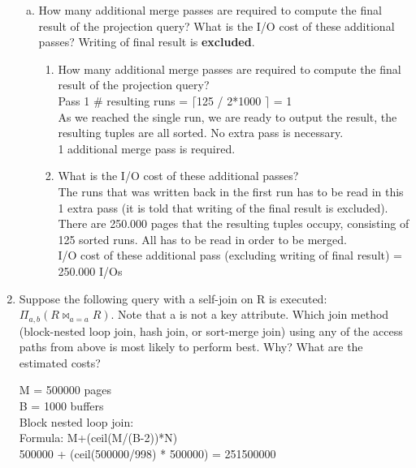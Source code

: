 \documentclass[10pt]{article}
\begin{document}
\begin{enumerate}
\begin{enumerate}[(a)]
			\item How many additional merge passes are required to compute the final result of the projection query? What is the I/O cost of these additional passes? Writing of final	result is \textbf{excluded}.
			
			\begin{enumerate}[1)]
				\item How many additional merge passes are required to compute the final result of the projection query?\\
				
				Pass 1 \# resulting runs = $ \Big\lceil$125 / 2*1000 $ \Big\rceil$ = 1\\
				As we reached the single run, we are ready to output the result, the resulting tuples are all sorted. No extra pass is necessary.\\
				
				1 additional merge pass is required.\\
				
				\item What is the I/O cost of these additional passes?\\
				
				The runs that was written back in the first run has to be read in this 1 extra pass (it is told that writing of the final result is excluded).\\
				
				There are 250.000 pages that the resulting tuples occupy, consisting of 125 sorted runs. All has to be read in order to be merged.\\
				
				I/O cost of these additional pass (excluding writing of final result) = 250.000 I/Os
			\end{enumerate}
			
			
			
			
		\end{enumerate}
		\item Suppose the following query with a self-join on R is executed:$\Pi_{a,b}(R\bowtie _{a=a}R)$. Note that a is not a key attribute. Which join method (block-nested loop join, hash join, or sort-merge
		join) using any of the access paths from above is most likely to perform best. Why? What
		are the estimated costs?
		
		M =  500000 pages\\
		B = 1000 buffers\\
		
		Block nested loop join:\\
		Formula: M+(ceil(M/(B-2))*N)\\
		500000 + (ceil(500000/998) * 500000) = 251500000
		

\end{enumerate}
\end{document}
